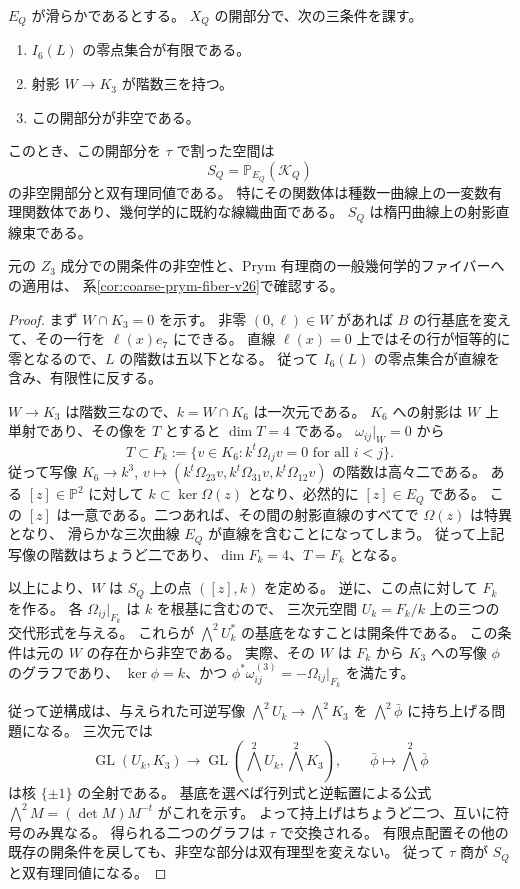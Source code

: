 \begin{theorem}[固定Gramファイバーの楕円線織面モデル]
\label{thm:gram-fiber-elliptic-ruled-v26}
$E_Q$ が滑らかであるとする。
$X_Q$ の開部分で、次の三条件を課す。
\begin{enumerate}
\item $I_6(L)$ の零点集合が有限である。
\item 射影 $W\to K_3$ が階数三を持つ。
\item この開部分が非空である。
\end{enumerate}
このとき、この開部分を $\tau$ で割った空間は
\[
 S_Q=\mathbb P_{E_Q}(\mathcal K_Q)
\]
の非空開部分と双有理同値である。
特にその関数体は種数一曲線上の一変数有理関数体であり、幾何学的に既約な線織曲面である。
$S_Q$ は楕円曲線上の射影直線束である。

元の $Z_3$ 成分での開条件の非空性と、Prym 有理商の一般幾何学的ファイバーへの適用は、
系\ref{cor:coarse-prym-fiber-v26}で確認する。
\end{theorem}

\begin{proof}
まず $W\cap K_3=0$ を示す。
非零 $(0,\ell)\in W$ があれば $B$ の行基底を変えて、その一行を $\ell(x)e_7$ にできる。
直線 $\ell(x)=0$ 上ではその行が恒等的に零となるので、$L$ の階数は五以下となる。
従って $I_6(L)$ の零点集合が直線を含み、有限性に反する。

$W\to K_3$ は階数三なので、$k=W\cap K_6$ は一次元である。
$K_6$ への射影は $W$ 上単射であり、その像を $T$ とすると $\dim T=4$ である。
$\omega_{ij}|_W=0$ から
\[
 T\subset F_k:=\{v\in K_6:k^t\Omega_{ij}v=0\text{ for all }i<j\}.
\]
従って写像 $K_6\to k^3$, $v\mapsto(k^t\Omega_{23}v,k^t\Omega_{31}v,k^t\Omega_{12}v)$ の階数は高々二である。
ある $[z]\in\mathbb P^2$ に対して $k\subset\ker\Omega(z)$ となり、必然的に $[z]\in E_Q$ である。
この $[z]$ は一意である。二つあれば、その間の射影直線のすべてで $\Omega(z)$ は特異となり、
滑らかな三次曲線 $E_Q$ が直線を含むことになってしまう。
従って上記写像の階数はちょうど二であり、$\dim F_k=4$、$T=F_k$ となる。

以上により、$W$ は $S_Q$ 上の点 $([z],k)$ を定める。
逆に、この点に対して $F_k$ を作る。
各 $\Omega_{ij}|_{F_k}$ は $k$ を根基に含むので、
三次元空間 $U_k=F_k/k$ 上の三つの交代形式を与える。
これらが $\bigwedge^2U_k^*$ の基底をなすことは開条件である。
この条件は元の $W$ の存在から非空である。
実際、その $W$ は $F_k$ から $K_3$ への写像 $\phi$ のグラフであり、
$\ker\phi=k$、かつ $\phi^*\omega_{ij}^{(3)}=-\Omega_{ij}|_{F_k}$ を満たす。

従って逆構成は、与えられた可逆写像
$\bigwedge^2U_k\to\bigwedge^2K_3$ を $\bigwedge^2\bar\phi$ に持ち上げる問題になる。
三次元では
\[
 \operatorname{GL}(U_k,K_3)\longrightarrow
 \operatorname{GL}(\bigwedge^2U_k,\bigwedge^2K_3),\qquad
 \bar\phi\longmapsto\bigwedge^2\bar\phi
\]
は核 $\{\pm1\}$ の全射である。
基底を選べば行列式と逆転置による公式
$\bigwedge^2M=(\det M)M^{-t}$ がこれを示す。
よって持上げはちょうど二つ、互いに符号のみ異なる。
得られる二つのグラフは $\tau$ で交換される。
有限点配置その他の既存の開条件を戻しても、非空な部分は双有理型を変えない。
従って $\tau$ 商が $S_Q$ と双有理同値になる。
\end{proof}

